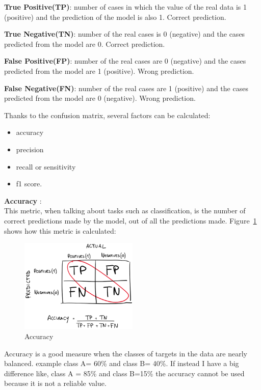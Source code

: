 \textbf{True Positive(TP)}: number of cases in which the value of the real data is 1 (positive) and the prediction of the model is also 1. Correct prediction.

\textbf{True Negative(TN)}: number of the real cases is 0 (negative) and the cases predicted from the model are 0. Correct prediction.

\textbf{False Positive(FP)}: number of the real cases are 0 (negative) and the cases predicted from the model are 1 (positive). Wrong prediction. 

\textbf{False Negative(FN)}: number of the real cases are 1 (positive) and the cases predicted from the model are 0 (negative). Wrong prediction. 

Thanks to the confusion matrix, several factors can be calculated:
\begin{itemize}
    \item accuracy
    \item precision
    \item recall or sensitivity
    \item f1 score.
\end{itemize}

\textbf{Accuracy} \cite{brownlee_how_2020}:\\
This metric, when talking about tasks such as classification, is the number of correct predictions made by the model, out of all the predictions made.
Figure~\ref{fig:fig_acc} shows how this metric is calculated:
\begin{figure}[ht!]
\centering
\includegraphics[width=0.5\textwidth]{images/acc.png}
\caption{Accuracy}
\label{fig:fig_acc}
\end{figure}
\FloatBarrier

Accuracy is a good measure when the classes of targets in the data are nearly balanced. 
example class A= 60\% and class B= 40\%. 
If instead I have a big difference like, class A = 85\% and class B=15\% the accuracy cannot be used because it is not a reliable value.

